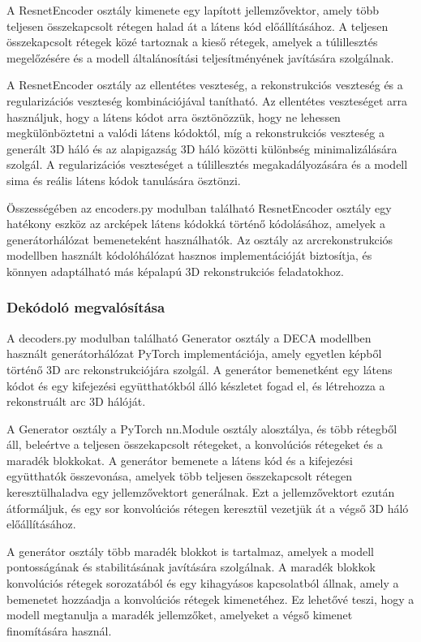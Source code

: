 \documentclass[12pt,a4]{article}
\begin{document}
A ResnetEncoder osztály kimenete egy lapított jellemzővektor, amely több teljesen összekapcsolt rétegen halad át a látens kód előállításához. 
A teljesen összekapcsolt rétegek közé tartoznak a kieső rétegek, amelyek a túlillesztés megelőzésére és a modell általánosítási teljesítményének javítására szolgálnak.

A ResnetEncoder osztály az ellentétes veszteség, a rekonstrukciós veszteség és a regularizációs veszteség kombinációjával tanítható.
Az ellentétes veszteséget arra használjuk, hogy a látens kódot arra ösztönözzük, hogy ne lehessen megkülönböztetni a valódi látens kódoktól, 
 míg a rekonstrukciós veszteség a generált 3D háló és az alapigazság 3D háló közötti különbség minimalizálására szolgál.
 A regularizációs veszteséget a túlillesztés megakadályozására és a modell sima és reális látens kódok tanulására ösztönzi.

Összességében az encoders.py modulban található ResnetEncoder osztály egy hatékony eszköz az arcképek látens kódokká történő kódolásához, amelyek a generátorhálózat bemeneteként használhatók. 
Az osztály az arcrekonstrukciós modellben használt kódolóhálózat hasznos implementációját biztosítja, és könnyen adaptálható más képalapú 3D rekonstrukciós feladatokhoz.

 \subsubsection{Dekódoló megvalósítása}
 A decoders.py modulban található Generator osztály a DECA modellben használt generátorhálózat PyTorch implementációja, amely egyetlen képből történő 3D arc rekonstrukciójára szolgál.
 A generátor bemenetként egy látens kódot és egy kifejezési együtthatókból álló készletet fogad el, és létrehozza a rekonstruált arc 3D hálóját.
 
 A Generator osztály a PyTorch nn.Module osztály alosztálya, és több rétegből áll, beleértve a teljesen összekapcsolt rétegeket, a konvolúciós rétegeket és a maradék blokkokat. 
A generátor bemenete a látens kód és a kifejezési együtthatók összevonása, amelyek több teljesen összekapcsolt rétegen keresztülhaladva egy jellemzővektort generálnak. 
Ezt a jellemzővektort ezután átformáljuk, és egy sor konvolúciós rétegen keresztül vezetjük át a végső 3D háló előállításához.

A generátor osztály több maradék blokkot is tartalmaz, amelyek a modell pontosságának és stabilitásának javítására szolgálnak. 
A maradék blokkok konvolúciós rétegek sorozatából és egy kihagyásos kapcsolatból állnak, amely a bemenetet hozzáadja a konvolúciós rétegek kimenetéhez.
 Ez lehetővé teszi, hogy a modell megtanulja a maradék jellemzőket, amelyeket a végső kimenet finomítására használ.
 
\end{document}
